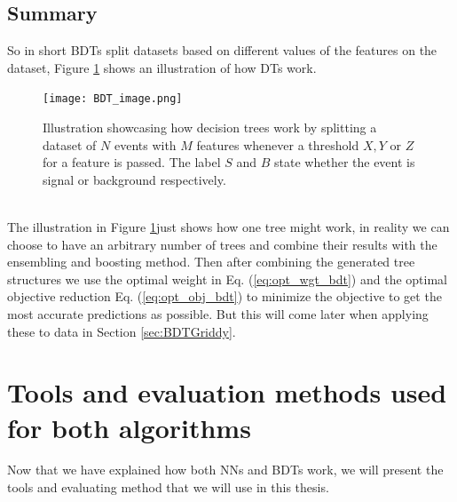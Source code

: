 \documentclass[12pt, a4paper]{book}
\begin{document}
\subsection{Summary}
So in short BDTs split datasets based on different values of the features on the dataset, Figure \ref{fig:DT_ilus} shows an illustration of how DTs work.
\graphicspath{{../../figures/}}
\begin{figure}[!ht]
	\centering
    \texttt{[image: BDT\_image.png]}
    \caption[Basic Decision Tree illustration]{Illustration showcasing how decision trees work by splitting a dataset of $N$ events with $M$ features whenever a threshold $X, Y$ or $Z$ for a feature is passed. The label $S$ and $B$ state whether the event is signal or background respectively.}\label{fig:DT_ilus}
\end{figure}
\\The illustration in Figure \ref{fig:DT_ilus}just shows how one tree might work, in reality we can choose to have an arbitrary number of trees and combine their results with the ensembling and boosting method. Then after combining the generated tree structures we use the optimal weight in Eq. (\ref{eq:opt_wgt_bdt}) and the optimal objective reduction Eq. (\ref{eq:opt_obj_bdt}) 
to minimize the objective to get the most accurate predictions as possible. But this will come later when applying these to data in Section \ref{sec:BDTGriddy}.

\clearpage
\section[Tools and evaluation methods]{Tools and evaluation methods used for both algorithms}\label{sec:tools}
Now that we have explained how both NNs and BDTs work, we will present the tools and evaluating method that we will use in this thesis. 
\end{document}
